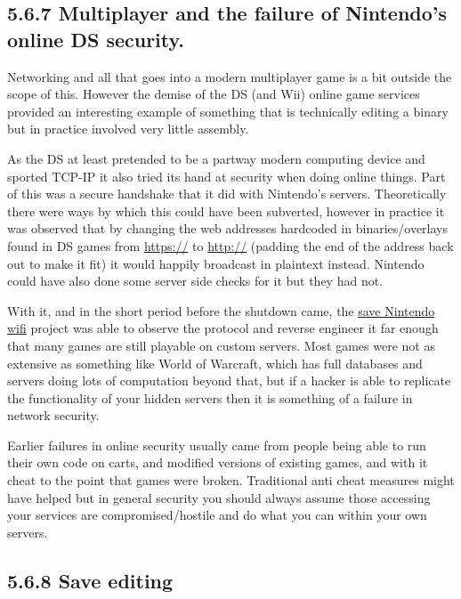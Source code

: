 \documentclass[
]{book}
\begin{document}
\hypertarget{multiplayer-and-the-failure-of-nintendos-online-ds-security.}{%
\subsection{5.6.7 Multiplayer and the failure of Nintendo's online DS security.}\label{multiplayer-and-the-failure-of-nintendos-online-ds-security.}}

Networking and all that goes into a modern multiplayer game is a bit outside the scope of this. However the demise of the DS (and Wii) online game services provided an interesting example of something that is technically editing a binary but in practice involved very little assembly.

As the DS at least pretended to be a partway modern computing device and sported TCP-IP it also tried its hand at security when doing online things. Part of this was a secure handshake that it did with Nintendo's servers. Theoretically there were ways by which this could have been subverted, however in practice it was observed that by changing the web addresses hardcoded in binaries/overlays found in DS games from \url{https://} to \url{http://} (padding the end of the address back out to make it fit) it would happily broadcast in plaintext instead. Nintendo could have also done some server side checks for it but they had not.

With it, and in the short period before the shutdown came, the \href{http://gbatemp.net/threads/save-nintendo-wifi-a-project-to-save-online-servers-for-ds-and-wii-games.362717/}{save Nintendo wifi} project was able to observe the protocol and reverse engineer it far enough that many games are still playable on custom servers. Most games were not as extensive as something like World of Warcraft, which has full databases and servers doing lots of computation beyond that, but if a hacker is able to replicate the functionality of your hidden servers then it is something of a failure in network security.

Earlier failures in online security usually came from people being able to run their own code on carts, and modified versions of existing games, and with it cheat to the point that games were broken. Traditional anti cheat measures might have helped but in general security you should always assume those accessing your services are compromised/hostile and do what you can within your own servers.

\hypertarget{save-editing}{%
\subsection{5.6.8 Save editing}\label{save-editing}}
\end{document}
